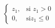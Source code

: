 \documentclass[preview]{standalone}
\begin{document}
\begin{align*}
\begin{cases}z_1, & \text{si } z_1 > 0 \\0, & \text{si} z_1 \leq 0\end{cases}
\end{align*}
\end{document}
